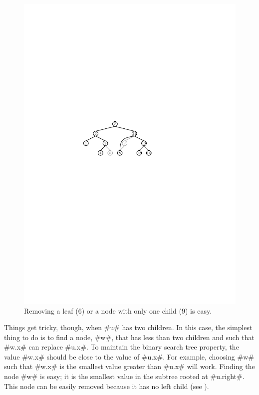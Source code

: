 \begin{figure}
  \begin{center}
    \includegraphics[scale=0.90909]{figs/bst-splice}
  \end{center}
  \caption{Removing a leaf ($6$) or a node with only one child ($9$) is easy.}
\end{figure}

Things get tricky, though, when #u# has two children.  In this case,
the simplest thing to do is to find a node, #w#, that has less than
two children and such that #w.x# can replace #u.x#.  To maintain
the binary search tree property, the value #w.x# should be close to the
value of #u.x#.  For example, choosing #w# such that #w.x# is the smallest
value greater than #u.x# will work.  Finding the node #w# is easy; it is
the smallest value in the subtree rooted at #u.right#.  This node can
be easily removed because it has no left child (see ).

